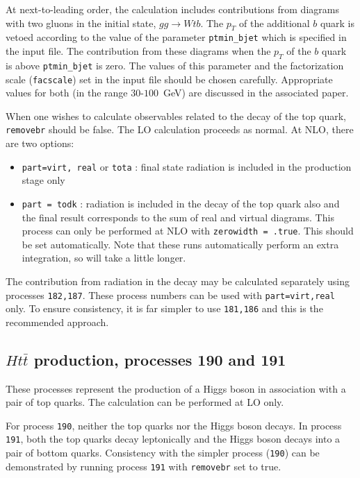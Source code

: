 \documentclass[12pt]{article}
\begin{document}
At next-to-leading order, the calculation includes contributions from diagrams
with two gluons in the initial state, $gg \rightarrow Wtb$. The $p_T$ of the
additional $b$ quark is vetoed according to the value of the parameter
{\tt ptmin\_bjet} which is specified in the input file. The contribution from
these diagrams when the $p_T$ of the $b$ quark is above {\tt ptmin\_bjet}
is zero. The values of this parameter and the factorization scale ({\tt facscale})
set in the input file should be chosen carefully. Appropriate values for both
(in the range $30$-$100$~GeV) are discussed in the associated paper.

When one wishes to calculate observables related to the decay of the top
quark, {\tt removebr} should be false.
The LO calculation proceeds as normal. At NLO, there are two options:
\begin{itemize}
\item {\tt part=virt, real} or {\tt tota} : final state radiation is included
in the production stage only
\item {\tt part = todk} : radiation is included in the decay of the top
quark also and the final result corresponds to the sum of real and virtual
diagrams. This process can only be performed at NLO with 
{\tt zerowidth = .true}. This should be set automatically.
Note that these runs automatically perform an extra integration, so
will take a little longer.
\end{itemize}

The contribution from radiation in the decay may be calculated separately using
processes {\tt 182,187}. These process numbers can be used with {\tt part=virt,real}
only. To ensure consistency, it is far simpler to use {\tt 181,186}
and this is the recommended approach.

\subsection{$Ht{\bar t}$ production, processes 190 and 191}
\label{subsec:htt}

These processes represent the production of a Higgs boson in association
with a pair of top quarks. The calculation can be performed at LO only.

For process {\tt 190}, neither the top quarks nor the Higgs boson
decays. In process {\tt 191}, both the top quarks decay leptonically
and the Higgs boson decays into a pair of bottom quarks. 
Consistency with
the simpler process ({\tt 190}) can be demonstrated by running process
{\tt 191} with {\tt removebr} set to true.
\end{document}
